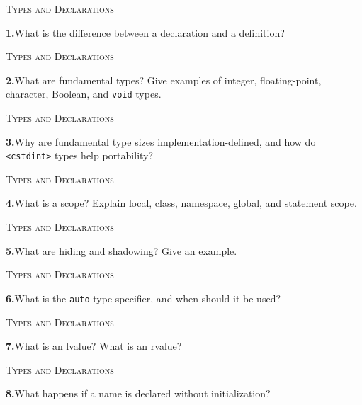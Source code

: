 \documentclass[11pt,a4paper]{article}
\newenvironment{questionblock}{%
  \begin{minipage}[t][0.455\textheight][t]{\textwidth}%
  \raggedright\small
}{%
  \vfill
  \end{minipage}%
}
\newcommand{\sectionlabel}[1]{\textsc{#1}\par\vspace{0.35em}}
\newcommand{\questionnumber}[1]{\textbf{#1.}\enspace}
\begin{document}
\begin{questionblock}
\sectionlabel{Types and Declarations}
\questionnumber{1}What is the difference between a declaration and a definition?\par
\end{questionblock}
\vspace*{0.04\textheight}
\begin{questionblock}
\sectionlabel{Types and Declarations}
\questionnumber{2}What are fundamental types? Give examples of integer, floating-point, character, Boolean, and \verb|void| types.\par
\end{questionblock}
\newpage
\begin{questionblock}
\sectionlabel{Types and Declarations}
\questionnumber{3}Why are fundamental type sizes implementation-defined, and how do \verb|<cstdint>| types help portability?\par
\end{questionblock}
\vspace*{0.04\textheight}
\begin{questionblock}
\sectionlabel{Types and Declarations}
\questionnumber{4}What is a scope? Explain local, class, namespace, global, and statement scope.\par
\end{questionblock}
\newpage
\begin{questionblock}
\sectionlabel{Types and Declarations}
\questionnumber{5}What are hiding and shadowing? Give an example.\par
\end{questionblock}
\vspace*{0.04\textheight}
\begin{questionblock}
\sectionlabel{Types and Declarations}
\questionnumber{6}What is the \verb|auto| type specifier, and when should it be used?\par
\end{questionblock}
\newpage
\begin{questionblock}
\sectionlabel{Types and Declarations}
\questionnumber{7}What is an lvalue? What is an rvalue?\par
\end{questionblock}
\vspace*{0.04\textheight}
\begin{questionblock}
\sectionlabel{Types and Declarations}
\questionnumber{8}What happens if a name is declared without initialization?\par
\end{questionblock}
\end{document}
